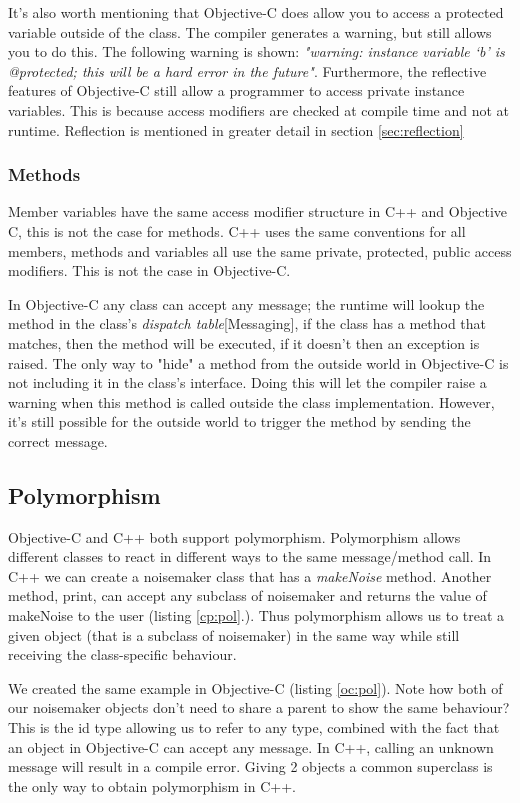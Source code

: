 \documentclass[11pt, a4paper, twocolumn]{article}
\begin{document}
It's also worth mentioning that Objective-C does allow you to access a protected variable outside of the class. The compiler generates a warning, but still allows you to do this. The following warning is shown: 
\textit{"warning: instance variable ‘b’ is @protected; this will be a hard error in the future"}.
Furthermore, the reflective features of Objective-C still allow a programmer to access private instance variables. This is because access modifiers are checked at compile time and not at runtime. Reflection is mentioned in greater detail in section \ref{sec:reflection}

\subsubsection{Methods}
Member variables have the same access modifier structure in C++ and Objective C, this is not the case for methods. C++ uses the same conventions for all members, methods and variables all use the same private, protected, public access modifiers. This is not the case in Objective-C. 

In Objective-C any class can accept any message; the runtime will lookup the method in the class's \textit{dispatch table}\cite{OCRPG}[Messaging], if the class has a method that matches, then the method will be executed, if it doesn't then an exception is raised. The only way to "hide" a method from the outside world in Objective-C is not including it in the class's interface. Doing this will let the compiler raise a warning when this method is called outside the class implementation. However, it's still possible for the outside world to trigger the method by sending the correct message.

\subsection{Polymorphism}
\label{sec:polymorphism}

Objective-C and C++ both support polymorphism. Polymorphism allows different classes to react in different ways to the same message/method call. In C++ we can create a noisemaker class that has a \textit{makeNoise} method. Another method, print, can accept any subclass of noisemaker and returns the value of makeNoise to the user (listing \ref{cp:pol}.). 
Thus polymorphism allows us to treat a given object (that is a subclass of noisemaker) in the same way while still receiving the class-specific behaviour.

We created the same example in Objective-C (listing \ref{oc:pol}). Note how both of our noisemaker objects don't need to share a parent to show the same behaviour? This is the id type allowing us to refer to any type, combined with the fact that an object in Objective-C can accept any message. In C++, calling an unknown message will result in a compile error. Giving 2 objects a common superclass is the only way to obtain polymorphism in C++. 
\end{document}
